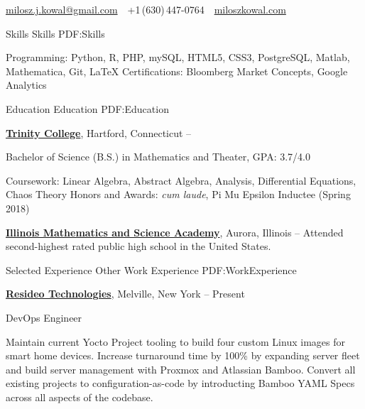 \documentclass[letterpaper,MMMyyyy,nonstopmode]{simpleresumecv}
\newcommand{\CVAuthor}{Milosz Kowal}
\newcommand{\CVWebpage}{https://miloszkowal.com}
\begin{document}

\Title{\CVAuthor}

\begin{SubTitle}
\par
\href{mailto:milosz.j.kowal@gmail.com}
{milosz.j.kowal@gmail.com}
\,\SubBulletSymbol\,
+1\,(630)\,447-0764
\,\SubBulletSymbol\,
\href{\CVWebpage}
{miloszkowal.com}
\end{SubTitle}

\begin{Body}


\Section
{Skills}
{Skills}
{PDF:Skills}

\Entry
Programming: Python, R, PHP, mySQL, HTML5, CSS3, PostgreSQL, Matlab, Mathematica, Git, \LaTeX{} \hfill\break{}
Certifications: Bloomberg Market Concepts, Google Analytics


\hrulefill
\Section
{Education}
{Education}
{PDF:Education}

\Entry
\href{http://www.trincoll.edu}
{\textbf{Trinity College}},
Hartford, Connecticut
\hfill
{} --

\Gap
\BulletItem
Bachelor of Science (B.S.) in
Mathematics and Theater, GPA: 3.7/4.0
\begin{Detail}
\SubBulletItem
Coursework: Linear Algebra, Abstract Algebra, Analysis, Differential Equations, Chaos Theory
\SubBulletItem
Honors and Awards: \textit{cum laude}, Pi Mu Epsilon Inductee (Spring 2018)
\end{Detail}

\BigGap
\Entry
\href{http://www.imsa.edu}
{\textbf{Illinois Mathematics and Science Academy}},
Aurora, Illinois
\hfill
{} --
\Gap
\BulletItem
Attended second-highest rated public high school in the United States.


\hrulefill
\Section
{Selected\newline
Experience}
{Other Work Experience}
{PDF:WorkExperience}

\Entry
\href{https://resideo.com/}
{\textbf{Resideo Technologies}},
Melville, New York
\hfill
{} --
Present

\Gap
\BulletItem
DevOps Engineer
\begin{Detail}
\SubBulletItem
Maintain current Yocto Project tooling to build four custom Linux images for smart home devices.
\SubBulletItem
Increase turnaround time by 100\% by expanding server fleet and build server management with Proxmox and Atlassian Bamboo.
\SubBulletItem
Convert all existing projects to configuration-as-code by introducting Bamboo YAML Specs across all aspects of the codebase.
\end{Detail}


\end{Body}
\end{document}
